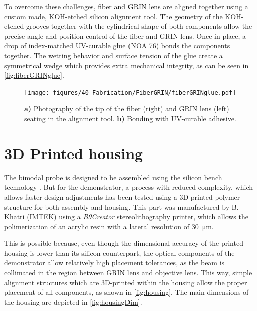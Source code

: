 To overcome these challenges, fiber and GRIN lens are aligned together using a custom made, KOH-etched silicon alignment tool. The geometry of the KOH-etched grooves together with the cylindrical shape of both components allow the precise angle and position control of the fiber and GRIN lens. Once in place, a drop of index-matched UV-curable glue (NOA 76) bonds the components together. The wetting behavior and surface tension of the glue create a symmetrical wedge which provides extra mechanical integrity, as can be seen in \autoref{fig:fiberGRINglue}.

\begin{figure}[h!]\centering \texttt{[image: figures/40\_Fabrication/FiberGRIN/fiberGRINglue.pdf]}
      \caption{\textbf{a)} Photography of the tip of the fiber (right) and GRIN lens (left) seating in the alignment tool.
      \textbf{b)} Bonding with UV-curable adhesive.}
      \label{fig:fiberGRINglue}
\end{figure}




\section{3D Printed housing}

The bimodal probe is designed to be assembled using the silicon bench technology \cite{Kretschmer}. But for the demonstrator, a process with reduced complexity, which allows faster design adjustments has been tested using a 3D printed polymer structure for both assembly and housing. This part was manufactured by B. Khatri (IMTEK) using a \textit{B9Creator} stereolithography printer, which allows the polimerization of an acrylic resin with a lateral resolution of \SI{30}{\micro\meter}.

This is possible because, even though the dimensional accuracy of the printed housing is lower than its silicon counterpart, the optical components of the demonstrator allow relatively high placement tolerances, as the beam is collimated in the region between GRIN lens and objective lens. This way, simple alignment structures which are 3D-printed within the housing allow the proper placement of all components, as shown in \autoref{fig:housing}. The main dimensions of the housing are depicted in \autoref{fig:housingDim}.

